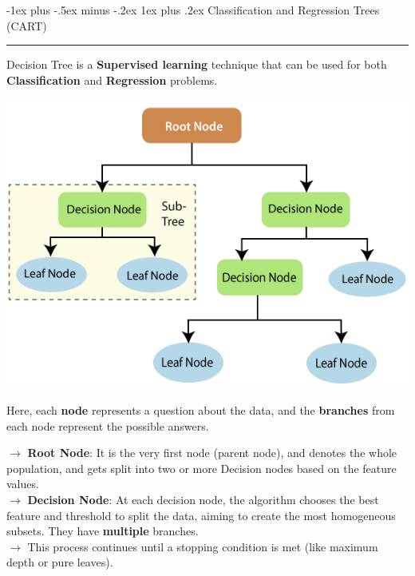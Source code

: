 \documentclass[letterpaper, 10.5pt,landscape]{article}
\makeatletter
\renewcommand{\subsubsection}{\@startsection{subsubsection}{3}{0mm}%
                                {-1ex plus -.5ex minus -.2ex}%
                                {1ex plus .2ex}%
                                {\normalfont\small\bfseries}}
\makeatother
\begin{document}
\begin{multicols*}{3}
\subsubsection{Classification and Regression Trees (CART)} {\color{teal}\hrule height 0.5pt} \smallskip

Decision Tree is a \textbf{Supervised learning} technique that can be used for both \textbf{Classification} and \textbf{Regression} problems. 



\vspace{-5pt}
\begin{center}
    \begin{minipage}{0.75\linewidth}
    \includegraphics[width=\textwidth]{figures/decision_trees.PNG}
    \end{minipage}
\end{center}
\vspace{-7pt}


Here, each \textbf{node} represents a question about the data, and the \textbf{branches} from each node represent the possible answers.


$\rightarrow$ \textbf{Root Node}: It is the very first node (parent node), and denotes the whole population, and gets split into two or more Decision nodes based on the feature values. \\
$\rightarrow$ \textbf{Decision Node}: At each decision node, the algorithm chooses the best feature and threshold to split the data, aiming to create the most homogeneous subsets. They have \textbf{multiple} branches.  \\

$\rightarrow$ This process continues until a stopping condition is met (like maximum depth or pure leaves). \\


\end{multicols*}
\end{document}
